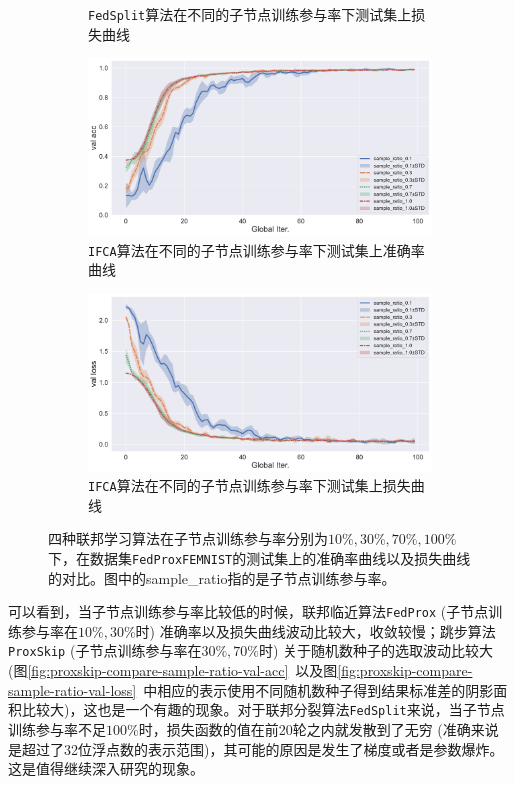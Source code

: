 \begin{figure}[ht]
\begin{subfigure}{.5\textwidth}
  \caption{\texttt{FedSplit}算法在不同的子节点训练参与率下测试集上损失曲线}
  \label{fig:fedsplit-compare-sample-ratio-val-loss}
\end{subfigure}
\begin{subfigure}{.5\textwidth}
  \centering
  \includegraphics[width=.95\linewidth]{figures/ifca-compare-sample-ratio-val-acc.pdf}
  \caption{\texttt{IFCA}算法在不同的子节点训练参与率下测试集上准确率曲线}
  \label{fig:ifca-compare-sample-ratio-val-acc}
\end{subfigure}%
\begin{subfigure}{.5\textwidth}
  \centering
  \includegraphics[width=.95\linewidth]{figures/ifca-compare-sample-ratio-val-loss.pdf}
  \caption{\texttt{IFCA}算法在不同的子节点训练参与率下测试集上损失曲线}
  \label{fig:ifca-compare-sample-ratio-val-loss}
\end{subfigure}
\caption{四种联邦学习算法在子节点训练参与率分别为$10\%, 30\%, 70\%, 100\%$下，在数据集\texttt{FedProxFEMNIST}的测试集上的准确率曲线以及损失曲线的对比。图中的sample\_ratio指的是子节点训练参与率。}
\label{fig:compare-sample-ratio}
\end{figure}

可以看到，当子节点训练参与率比较低的时候，联邦临近算法\texttt{FedProx} (子节点训练参与率在$10\%, 30\%$时) 准确率以及损失曲线波动比较大，收敛较慢；跳步算法\texttt{ProxSkip} (子节点训练参与率在$30\%, 70\%$时) 关于随机数种子的选取波动比较大 (图\ref{fig:proxskip-compare-sample-ratio-val-acc}~以及图\ref{fig:proxskip-compare-sample-ratio-val-loss}~中相应的表示使用不同随机数种子得到结果标准差的阴影面积比较大)，这也是一个有趣的现象。对于联邦分裂算法\texttt{FedSplit}来说，当子节点训练参与率不足$100\%$时，损失函数的值在前20轮之内就发散到了无穷 (准确来说是超过了32位浮点数的表示范围)，其可能的原因是发生了梯度或者是参数爆炸。这是值得继续深入研究的现象。
